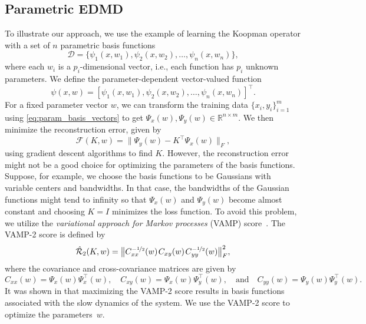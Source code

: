 \documentclass
[
    a4paper,
    DIV=11,
    abstract=true,
    11pt,
]
{scrartcl}
\newcommand{\ts}{\hspace*{0.1em}}                                %
\theoremstyle{definition}
\begin{document}
\subsection{Parametric EDMD}
To illustrate our approach, we use the example of learning the Koopman operator with a set of $n$ parametric basis functions
\begin{equation} \label{eq:edmd_param_basis}
    \mathcal{D} = \{ \psi_1(x, w_1), \psi_2(x, w_2) ,\ldots,\psi_n(x, w_n) \},
\end{equation}
where each $w_i$ is a $p_i$-dimensional vector, i.e., each function has $p_i$ unknown parameters. We define the parameter-dependent vector-valued function
\begin{equation} \label{eq:param_basis_vectors}
    \psi(x, w) = [\psi_1(x, w_1), \psi_2(x, w_2), \dots, \psi_n(x, w_n)]^\top.
\end{equation}
For a fixed parameter vector $w$, we can transform the training data $\{x_i, y_i\}_{i=1}^m$ using \eqref{eq:param_basis_vectors} to get $\Psi_x(w), \Psi_y(w) \in \mathbb{R}^{n \times m}$. We then minimize the reconstruction error, given by
\begin{equation} \label{eq:param_edmd}
    \mathcal{F}(K, w) = \big\| \Psi_y(w) - K^{\top} \Psi_x(w)\big\|_F,
\end{equation}
using gradient descent algorithms to find $K$. However, the reconstruction error might not be a good choice for optimizing the parameters of the basis functions. Suppose, for example, we choose the basis functions to be Gaussians with variable centers and bandwidths. In that case, the bandwidths of the Gaussian functions might tend to infinity so that $ \Psi_x(w) $ and $ \Psi_y(w) $ become almost constant and choosing $ K = I $ minimizes the loss function. To avoid this problem, we utilize the \emph{variational approach for Markov processes} (VAMP) score~\cite{mardt2018vampnets}. The VAMP-2 score is defined by
\begin{equation} \label{eq:vamp2_score_parametric}
        \mathcal{\hat{R}}_2(K, w) = \big\|C_{xx}^{-\nicefrac{1}{2}}(w) \ts C_{xy}(w) \ts C_{yy}^{-\nicefrac{1}{2}}(w)\big\|_F^2,
\end{equation}
where the covariance and cross-covariance matrices are given by
\begin{equation*}
    C_{xx}(w) = \Psi_x(w) \Psi_x^{\top}(w),\quad  C_{xy}(w) = \Psi_x(w) \Psi_y^{\top}(w), \quad \text{and} \quad C_{yy}(w) = \Psi_y(w) \Psi_y^{\top}(w).
\end{equation*}
It was shown in \cite{wu2020variational} that maximizing the VAMP-2 score results in basis functions associated with the slow dynamics of the system. We use the VAMP-2 score to optimize the parameters~$w$.
\end{document}
